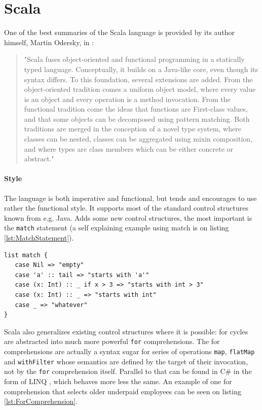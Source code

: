 \documentclass[12pt,a4paper]{report}
\begin{document}
\section{Scala}

One of the best summaries of the Scala language is provided by its author himself, Martin Odersky, in  \cite{ScalableComponents}:

\begin{quote}
"Scala fuses object-oriented and functional programming in a statically typed language. Conceptually, it builds on a Java-like core, even though its syntax differs. To this foundation, several extensions are added. From the object-oriented tradition comes a uniform object model, where every value is an object and every operation is a method invocation. From the functional tradition come the ideas that functions are First-class values, and that some objects can be decomposed using pattern matching. Both traditions are merged in the conception of a novel type system, where classes can be nested, classes can be aggregated using mixin composition, and where types are class members which can be either concrete or abstract."
\end{quote}

\paragraph{Style} The language is both imperative and functional, but tends and encourages to use rather the functional style. It supports most of the standard control structures known from e.g. Java. Adds some new control structures, the most important is the \texttt{match} statement (a self explaining example using match is on listing \ref{lst:MatchStatement}).

\begin{minipage}{\linewidth}
\begin{lstlisting}[caption={Match statement example.},label={lst:MatchStatement}]
list match {
   case Nil => "empty"
   case 'a' :: tail => "starts with 'a'"
   case (x: Int) :: _ if x > 3 => "starts with int > 3"
   case (x: Int) :: _ => "starts with int"
   case _ => "whatever"
}
\end{lstlisting}
\end{minipage}

Scala also generalizes existing control structures where it is possible: for cycles are abstracted into much more powerful \texttt{for} comprehensions. The for comprehensions are actually a syntax sugar for series of operations \texttt{map}, \texttt{flatMap} and \texttt{withFilter} whose semantics are defined by the target of their invocation, not by the \texttt{for} comprehension itself. Parallel to that can be found in C\# in the form of LINQ \cite{Linq}, which behaves more less the same. An example of one for comprehension that selects older underpaid employees can be seen on listing \ref{lst:ForComprehension}.
\end{document}
